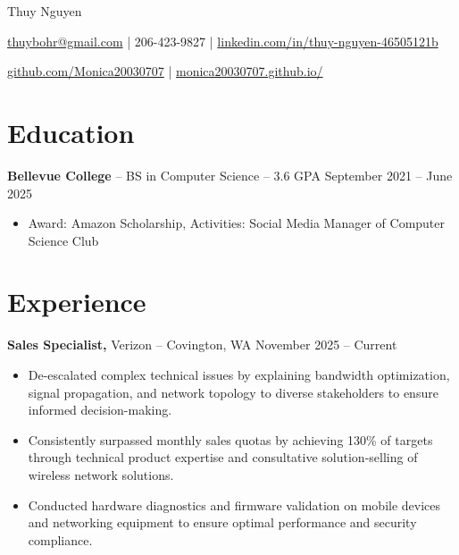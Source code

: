 \documentclass[11pt]{article}       %
\begin{document}
\centerline{\Huge Thuy Nguyen}

\vspace{5pt}

\centerline{\href{mailto:thuybohr@gmail.com}{thuybohr@gmail.com} | 206-423-9827 |
\href{https://www.linkedin.com/in/thuy-nguyen-46505121b/}{linkedin.com/in/thuy-nguyen-46505121b}}

\centerline{\href{https://github.com/Monica20030707}{github.com/Monica20030707} | 
\href{https://monica20030707.github.io/}{monica20030707.github.io/}} 

\vspace{-9pt}

\section*{Education}
\textbf{Bellevue College} -- BS in Computer Science -- 3.6 GPA \hfill September 2021 -- June 2025\\
\vspace{-9pt}
\begin{itemize}
  \item Award: Amazon Scholarship, Activities: Social Media Manager of Computer Science Club
\end{itemize}

\vspace{-18.5pt}

\section*{Experience}

\textbf{Sales Specialist,} {Verizon} -- Covington, WA \hfill November 2025 -- Current \\
\vspace{-9pt}
\begin{itemize}
  \item De-escalated complex technical issues by explaining bandwidth optimization, signal propagation, and network topology to diverse stakeholders to ensure informed decision-making.
  \item Consistently surpassed monthly sales quotas by achieving 130\% of targets through technical product expertise and consultative solution-selling of wireless network solutions.
  \item Conducted hardware diagnostics and firmware validation on mobile devices and networking equipment to ensure optimal performance and security compliance.
\end{itemize}
\end{document}
